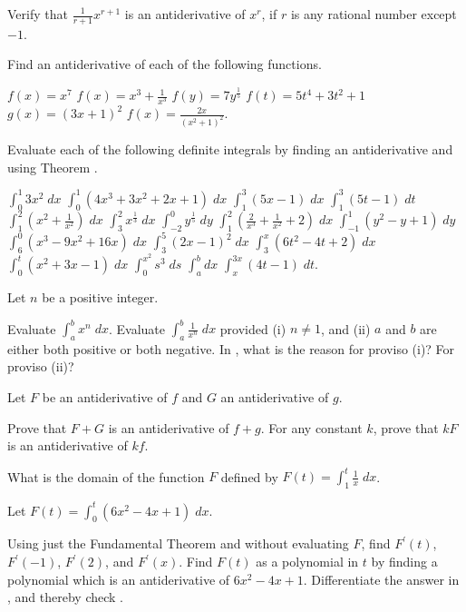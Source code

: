 \begin{exercises}

Verify that $\frac1{r+1} x^{r+1}$ is an antiderivative of
$x^r$, if $r$ is any rational number except $-1$.

Find an antiderivative of each of the following functions.
\begin{exenum}
\x
$f(x) = x^7$
\x
$f(x) = x^3 + \frac1{x^3}$
\x
$f(y) = 7y^\frac15$
\x
$f(t) = 5t^4 + 3t^2 + 1$
\x
$g(x) = (3x + 1)^2$
\x
$f(x) = \frac{2x}{(x^2 + 1)^2}$.
\end{exenum}

Evaluate each of the following definite integrals by finding
an antiderivative and using Theorem .
\begin{exenum}
\x
$\int_0^1 3x^2 \; dx$
\x
$\int_0^1 (4x^3 + 3x^2 + 2x + 1) \; dx$
\x
$\int_1^3 (5x - 1) \; dx$
\x
$\int_1^3 (5t - 1) \; dt$
\x
$\int_1^2 \left( x^2 + \frac1{x^2} \right) \; dx$
\x
$\int_3^2 x^\frac13 \; dx$
\x
$\int_{-2}^0 y^\frac15 \; dy$
\x
$\int_1^2 \left( \frac2{x^3} + \frac1{x^2} + 2 \right) \; dx$
\x
$\int_{-1}^1 (y^2 - y + 1) \; dy$
\x
$\int_6^0 (x^3 - 9x^2 + 16x) \; dx$
\x
$\int_3^5 (2x - 1)^2 \; dx$
\x
$\int_3^x (6t^2 - 4t + 2) \; dx$
\x
$\int_0^t (x^2 + 3x - 1) \; dx$
\x
$\int_0^{x^2} s^3 \; ds$
\x
$\int_a^b dx$
\x
$\int_x^{3x} (4t - 1) \; dt$.
\end{exenum}

Let $n$ be a positive integer.
\begin{exenum}
\x
Evaluate $\int_a^b x^n \; dx$.
\x
{}
Evaluate $\int_a^b \frac1{x^n} \; dx$ provided
(i) $n \ne 1$, and (ii) $a$ and $b$ are either
both positive or both negative.
\x
In , what is the reason for proviso (i)?
For proviso (ii)?
\end{exenum}

Let $F$ be an antiderivative of $f$ and $G$
an antiderivative of $g$.
\begin{exenum}
\x
Prove that $F+G$ is an antiderivative of $f+g$.
\x
For any constant $k$,
prove that $kF$ is an antiderivative of $kf$.
\end{exenum}

What is the domain of the function $F$ defined by
$F(t) = \int_1^t \frac1x \; dx$.

Let $F(t) = \int_0^t (6x^2 - 4x + 1) \; dx$.
\begin{exenum}
\x
{}
Using just the Fundamental Theorem and without evaluating
$F$, find $F^\prime(t)$, $F^\prime(-1)$, $F^\prime(2)$,
and $F^\prime(x)$.
\x
{}
Find $F(t)$ as a polynomial in $t$ by finding a polynomial
which is an antiderivative of $6x^2 - 4x + 1$.
\x
Differentiate the answer in ,
and thereby check .
\end{exenum}


\end{exercises}
